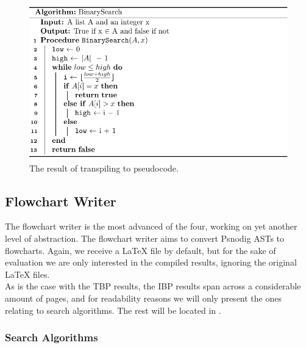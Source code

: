 \begin{figure}[ht!]
    \centering
    \includegraphics[scale=.8]{assets/chapter6/search/BinarySearch_tbp.pdf}
    \caption{The result of transpiling  to pseudocode.}
    \label{binarySearchTBP}
\end{figure}

\subsection{Flowchart Writer}

The flowchart writer is the most advanced of the four, working on yet another level of abstraction. The flowchart writer aims to convert Psnodig ASTs to flowcharts. Again, we receive a LaTeX file by default, but for the sake of evaluation we are only interested in the compiled results, ignoring the original LaTeX files. \\

As is the case with the TBP results, the IBP results span across a considerable amount of pages, and for readability reasons we will only present the ones relating to search algorithms. The rest will be located in .

\subsubsection{Search Algorithms}

